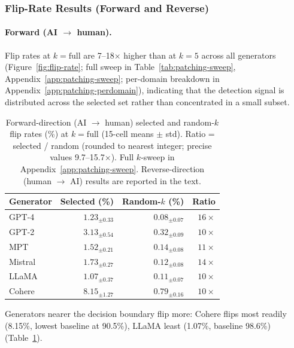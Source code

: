 \documentclass[11pt]{article}
\begin{document}
\subsubsection{Flip-Rate Results (Forward and Reverse)}
\label{sec:patching-results}

\paragraph{Forward (AI $\to$ human).}
Flip rates at $k = \text{full}$ are 7--18$\times$ higher than at $k = 5$ across all generators (Figure~\ref{fig:flip-rate}; full sweep in Table~\ref{tab:patching-sweep}, Appendix~\ref{app:patching-sweep}; per-domain breakdown in Appendix~\ref{app:patching-perdomain}), indicating that the detection signal is distributed across the selected set rather than concentrated in a small subset.

\begin{table}[t]
\centering
\small
\begin{tabular}{lrrr}
\toprule
Generator & Selected (\%) & Random-$k$ (\%) & Ratio \\
\midrule
GPT-4   & $1.23_{\pm 0.33}$ & $0.08_{\pm 0.07}$ & $16\times$ \\
GPT-2   & $3.13_{\pm 0.54}$ & $0.32_{\pm 0.09}$ & $10\times$ \\
MPT     & $1.52_{\pm 0.21}$ & $0.14_{\pm 0.08}$ & $11\times$ \\
Mistral & $1.73_{\pm 0.27}$ & $0.12_{\pm 0.08}$ & $14\times$ \\
LLaMA   & $1.07_{\pm 0.37}$ & $0.11_{\pm 0.07}$ & $10\times$ \\
Cohere  & $8.15_{\pm 1.27}$ & $0.79_{\pm 0.16}$ & $10\times$ \\
\bottomrule
\end{tabular}
\caption{Forward-direction (AI $\to$ human) selected and random-$k$ flip rates (\%) at $k = \text{full}$ (15-cell means $\pm$ std). Ratio = selected / random (rounded to nearest integer; precise values 9.7--15.7$\times$). Full $k$-sweep in Appendix~\ref{app:patching-sweep}. Reverse-direction (human $\to$ AI) results are reported in the text.}
\label{tab:patching-full}
\end{table}

Generators nearer the decision boundary flip more: Cohere flips most readily (8.15\%, lowest baseline at 90.5\%), LLaMA least (1.07\%, baseline 98.6\%) (Table~\ref{tab:patching-full}).
\end{document}
